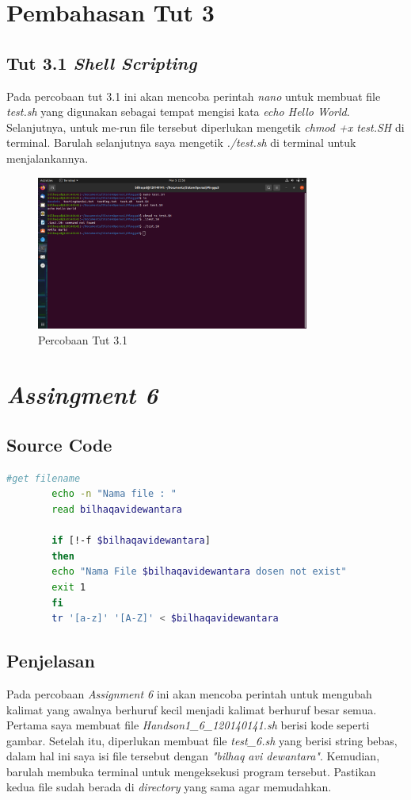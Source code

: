 \documentclass[11pt,a4paper]{article}
\begin{document}
\section{Pembahasan Tut 3}
\subsection{Tut 3.1 \textit{Shell Scripting}}
	Pada percobaan tut 3.1 ini akan mencoba perintah \textit{nano} untuk membuat file \textit{test.sh} yang digunakan sebagai tempat mengisi
	kata \textit{echo Hello World}. Selanjutnya, untuk me-run file tersebut diperlukan mengetik \textit{chmod +x test.SH} di terminal. Barulah 
	selanjutnya saya mengetik \textit{./test.sh} di terminal untuk menjalankannya.
	
	\begin{figure}[h]
		\centering
		\includegraphics[width=0.8\textwidth]{Figure/tut 3.png}
		\caption{Percobaan Tut 3.1}
	\end{figure}

\section{\textit{Assingment 6}}
\subsection*{Source Code}
\begin{lstlisting}[language=bash]
		#get filename
		echo -n "Nama file : "
		read bilhaqavidewantara

		if [!-f $bilhaqavidewantara]
		then
		echo "Nama File $bilhaqavidewantara dosen not exist"
		exit 1
		fi
		tr '[a-z]' '[A-Z]' < $bilhaqavidewantara 
	\end{lstlisting}
	
\subsection*{Penjelasan}
	Pada percobaan \textit{Assignment 6} ini akan mencoba perintah untuk mengubah kalimat yang awalnya berhuruf kecil menjadi 
	kalimat berhuruf besar semua. Pertama saya membuat file \textit{Handson1\_6\_120140141.sh} berisi kode seperti gambar.
	Setelah itu, diperlukan membuat file \textit{test\_6.sh} yang berisi string bebas, dalam hal ini saya isi file tersebut dengan 
	\textit{"bilhaq avi dewantara"}. Kemudian, barulah membuka terminal untuk mengeksekusi program tersebut.
	Pastikan kedua file sudah berada di \textit{directory} yang sama agar memudahkan.
	
\end{document}
